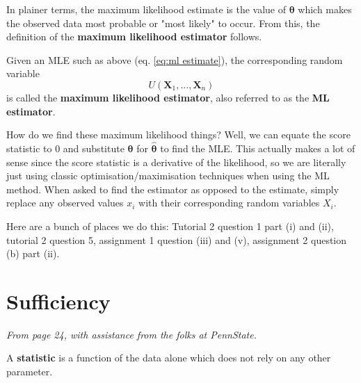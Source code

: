In plainer terms, the maximum likelihood estimate is the value of \(\bm{\theta}\) which makes the observed data most probable or "most likely" to occur. \autocite{rice}
From this, the definition of the \textbf{maximum likelihood estimator} follows.

\begin{definition}\label{defn:ml estimator}
    Given an MLE such as above (eq. \ref{eq:ml estimate}), the corresponding random variable
    \begin{equation}\label{eq:ml estimator}
        U(\bm{X}_1,...,\bm{X}_n)
    \end{equation}
    is called the \textbf{maximum likelihood estimator}, also referred to as the \textbf{ML estimator}.
\end{definition}

How do we find these maximum likelihood things? 
Well, we can equate the score statistic to \(0\) and substitute \(\bm{\theta}\) for \(\hat{\bm{\theta}}\) to find the MLE. 
This actually makes a lot of sense since the score statistic is a derivative of the likelihood, so we are literally just using classic optimisation/maximisation techniques when using the ML method. 
When asked to find the estimator as opposed to the estimate, simply replace any observed values \(x_i\) with their corresponding random variables \(X_i\).

\begin{exercise}
    Here are a bunch of places we do this: Tutorial 2 question 1 part (i) and (ii), tutorial 2 question 5, assignment 1 question (iii) and (v), assignment 2 question (b) part (ii).
\end{exercise}

\section{Sufficiency}\label{sec:sufficiency}

\textit{From page 24, with assistance from the folks at PennState\autocite{penn415}.}



A \textbf{statistic} is a function of the data alone which does not rely on any other parameter. 


